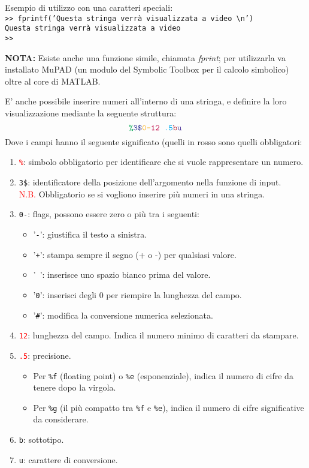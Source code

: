Esempio di utilizzo con una caratteri speciali: \\
\texttt{>> fprintf('Questa stringa verrà visualizzata a video \textbackslash n')} \\
\texttt{Questa stringa verrà visualizzata a video} \\
\texttt{>>}
\break

\textbf{NOTA:} Esiste anche una funzione simile, chiamata \textit{fprint}; per utilizzarla va installato MuPAD (un 
modulo del Symbolic Toolbox per il calcolo simbolico) oltre al core di MATLAB.

\newpage
E' anche possibile inserire numeri all'interno di una stringa, e definire la loro visualizzazione mediante la seguente 
struttura:
$$\texttt{\textcolor{Green}{\%}\textcolor{Blue}{3\$}\textcolor{Dandelion}{0-}\textcolor{purple}{12}
\textcolor{Cyan}{.5}\textcolor{Maroon}{b}\textcolor{Violet}{u}}$$
Dove i campi hanno il seguente significato (quelli in rosso sono quelli obbligatori:
\begin{enumerate}
	\item	\textcolor{red}{\texttt{\%}}: simbolo obbligatorio per identificare che si vuole 
						rappresentare un numero.
	\item 	\texttt{3\$}: identificatore della posizione dell'argomento nella funzione di input. \\
						\textcolor{red}{N.B.} Obbligatorio se si vogliono inserire più numeri in una stringa.
	\item 	\texttt{0-}: flags, possono essere zero o più tra i seguenti:
			\begin{itemize}
				\item	'\texttt{-}': giustifica il testo a sinistra.
				\item	'\texttt{+}': stampa sempre il segno (+ o -) per qualsiasi valore.
				\item	'\texttt{ }': inserisce uno spazio bianco prima del valore.
				\item	'\texttt{0}': inserisci degli 0 per riempire la lunghezza del campo.
				\item 	'\texttt{\#}': modifica la conversione numerica selezionata.			
			\end{itemize}
						
	\item	\textcolor{red}{\texttt{12}}: lunghezza del campo. Indica il numero minimo di caratteri da 
			stampare.
	\item	\textcolor{red}{\texttt{.5}}: precisione. 
			\begin{itemize}
				\item	Per \texttt{\%f} (floating point) o \texttt{\%e} (esponenziale), indica il
						numero di cifre da tenere dopo la virgola.
				\item 	Per \texttt{\%g} (il più compatto tra \texttt{\%f} e \texttt{\%e}), indica il
						numero di cifre significative da considerare.
			\end{itemize}
	\item 	\texttt{b}: sottotipo.
	\item	\texttt{u}: carattere di conversione.
\end{enumerate}
